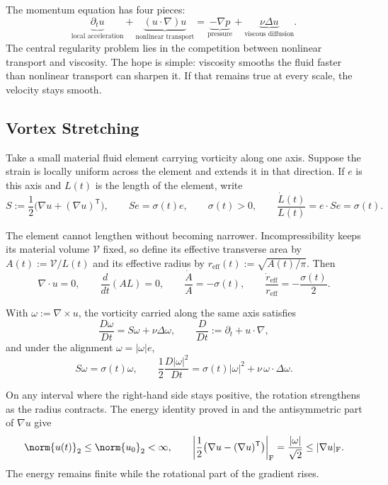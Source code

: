 
The momentum equation has four pieces:
\[
  \underbrace{\partial_t u}_{\text{local acceleration}}
  +
  \underbrace{(u\cdot\nabla)u}_{\text{nonlinear transport}}
  =
  \underbrace{-\nabla p}_{\text{pressure}}
  +
  \underbrace{\nu\Delta u}_{\text{viscous diffusion}}.
\]
The central regularity problem lies in the competition between nonlinear transport and viscosity.
The hope is simple: viscosity smooths the fluid faster than nonlinear transport can sharpen it.
If that remains true at every scale, the velocity stays smooth.

\subsection{Vortex Stretching}\label{sub:ThePerfectlyStretchingVortex}

Take a small material fluid element carrying vorticity along one axis.
Suppose the strain is locally uniform across the element and extends it in that direction.
If \(e\) is this axis and \(L(t)\) is the length of the element, write
\[
  S:=\frac12\bigl(\nabla u+(\nabla u)^{\mathsf T}\bigr),
  \qquad
  Se=\sigma(t)e,
  \qquad
  \sigma(t)>0,
  \qquad
  \frac{\dot L(t)}{L(t)}
  =
  e\cdot Se
  =
  \sigma(t).
\]

The element cannot lengthen without becoming narrower.
Incompressibility keeps its material volume \(\mathcal V\) fixed, so define its effective transverse area by \(A(t):=\mathcal V/L(t)\) and its effective radius by \(r_{\mathrm{eff}}(t):=\sqrt{A(t)/\pi}\).
Then
\[
  \nabla\cdot u=0,
  \qquad
  \frac{d}{dt}(A L)=0,
  \qquad
  \frac{\dot A}{A}=-\sigma(t),
  \qquad
  \frac{\dot r_{\mathrm{eff}}}{r_{\mathrm{eff}}}
  =
  -\frac{\sigma(t)}{2}.
\]

With \(\omega:=\nabla\times u\), the vorticity carried along the same axis satisfies
\[
  \frac{D\omega}{Dt}
  =
  S\omega+\nu\Delta\omega,
  \qquad
  \frac{D}{Dt}
  :=
  \partial_t+u\cdot\nabla,
\]
and under the alignment \(\omega=|\omega|e\),
\[
  S\omega
  =
  \sigma(t)\omega,
  \qquad
  \frac12\frac{D|\omega|^2}{Dt}
  =
  \sigma(t)|\omega|^2
  +
  \nu\,\omega\cdot\Delta\omega.
\]

On any interval where the right-hand side stays positive, the rotation strengthens as the radius contracts.
The energy identity proved in  and the antisymmetric part of \(\nabla u\) give
\[
  \norm{u(t)}_2
  \leq
  \norm{u_0}_2
  <\infty,
  \qquad
  \left|\frac12\bigl(\nabla u-(\nabla u)^{\mathsf T}\bigr)\right|_{\mathrm F}
  =
  \frac{|\omega|}{\sqrt2}
  \leq
  |\nabla u|_{\mathrm F}.
\]
The energy remains finite while the rotational part of the gradient rises.

